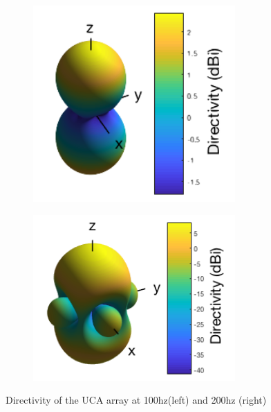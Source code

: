 \begin{figure}[H]
\centering
\begin{subfigure}{.5\textwidth}
    \includegraphics[width=0.85\textwidth]{Figures/uca100hzdirectivity4mic.png}
    \label{fig:directivity100hzuca}
\end{subfigure}%
\begin{subfigure}{.5\textwidth}
    \includegraphics[width=0.85\textwidth]{Figures/uca200hzdirectivity4mic.png}
    \label{fig:directivity100hzuca}
\end{subfigure}%
\caption{Directivity of the UCA array at 100hz(left) and 200hz (right)}
\end{figure}

